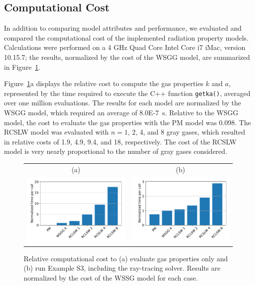 \documentclass[preprint,12pt]{elsarticle}
\begin{document}
\subsection{Computational Cost} \label{s:cost}

In addition to comparing model attributes and performance, we evaluated and compared the computational cost of the implemented radiation property models. 
Calculations were performed on a 4 GHz Quad Core Intel Core i7 iMac, version 10.15.7; the results, normalized by the cost of the WSGG model, are summarized in Figure~\ref{f:cost}. 

Figure~\ref{f:cost}a displays the relative cost to compute the gas properties $k$ and $a$, represented by the time required to execute the C++ function \texttt{get\textunderscore k\textunderscore a()}, averaged over one million evaluations. The results for each model are normalized by the WSGG model, which required an average of 8.0E-7~s. Relative to the WSGG model, the cost to evaluate the gas properties with the PM model was 0.098. The RCSLW model was evaluated with $n=1$, 2, 4, and 8 gray gases, which resulted in relative costs of 1.9, 4.9, 9.4, and 18, respectively. The cost of the RCSLW model is very nearly proportional to the number of gray gases considered.
%
\begin{figure}
    \begin{center}
    \begin{tabular}{c c}
        (a) & (b) \\
        \includegraphics[width=2.75 in]{fig_getka_c++.pdf} &
        \includegraphics[width=2.75 in]{fig_exS3_c++.pdf}
    \end{tabular}
    \caption{Relative computational cost to (a) evaluate gas properties only and (b) run Example S3, including the ray-tracing solver. Results are normalized by the cost of the WSSG model for each case.}
    \label{f:cost}
    \end{center}
\end{figure}
%
\end{document}
